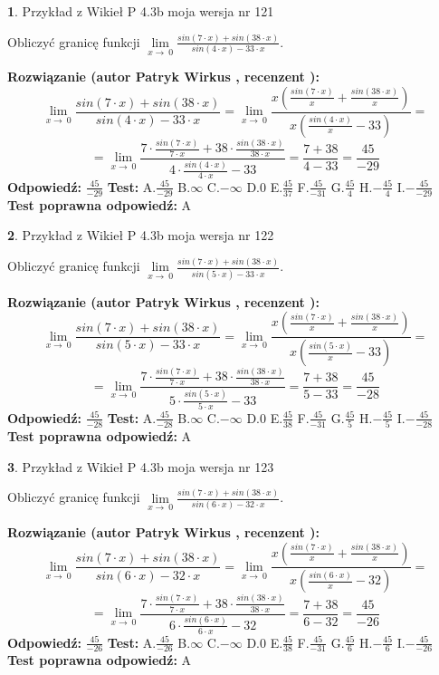 \documentclass[12pt, a4paper]{article}
\theoremstyle{definition} %
\newtheorem{zad}{}
\newcommand{\zadStart}[1]{\begin{zad}#1\newline}
\newcommand{\zadStop}{\end{zad}}
\newcommand{\rozwStart}[2]{\noindent \textbf{Rozwiązanie (autor #1 , recenzent #2): }\newline}
\newcommand{\rozwStop}{\newline}
\newcommand{\odpStart}{\noindent \textbf{Odpowiedź:}\newline}
\newcommand{\odpStop}{\newline}
\newcommand{\testStart}{\noindent \textbf{Test:}\newline}
\newcommand{\testStop}{\newline}
\newcommand{\kluczStart}{\noindent \textbf{Test poprawna odpowiedź:}\newline}
\newcommand{\kluczStop}{\newline}
\begin{document}
\zadStart{Przykład z Wikieł P 4.3b moja wersja nr 121}


Obliczyć granicę funkcji $\lim\limits_{x\to\ 0}\frac{sin(7 \cdot x)+sin(38 \cdot x)}{sin(4 \cdot x)-33 \cdot x}$.
\zadStop
\rozwStart{Patryk Wirkus}{}
$$\lim\limits_{x\to\ 0}\frac{sin(7 \cdot x)+sin(38 \cdot x)}{sin(4 \cdot x)-33 \cdot x}=\lim\limits_{x\to\ 0}\frac{x(\frac{sin(7 \cdot x)}{x}+\frac{sin(38 \cdot x)}{x})}{x(\frac{sin(4 \cdot x)}{x}-33)}=$$
$$=\lim\limits_{x\to\ 0}\frac{7 \cdot \frac{sin(7 \cdot x)}{7 \cdot x}+38 \cdot \frac{sin(38 \cdot x)}{38 \cdot x}}{4 \cdot \frac{sin(4 \cdot x)}{4 \cdot x}-33}=\frac{7+38}{4-33} = \frac{45}{-29}$$
\rozwStop
\odpStart
$\frac{45}{-29}$
\odpStop
\testStart
A.$\frac{45}{-29}$
B.$\infty$
C.$-\infty$
D.$0$
E.$\frac{45}{37}$
F.$\frac{45}{-31}$
G.$\frac{45}{4}$
H.$-\frac{45}{4}$
I.$-\frac{45}{-29}$
\testStop
\kluczStart
A
\kluczStop



\zadStart{Przykład z Wikieł P 4.3b moja wersja nr 122}


Obliczyć granicę funkcji $\lim\limits_{x\to\ 0}\frac{sin(7 \cdot x)+sin(38 \cdot x)}{sin(5 \cdot x)-33 \cdot x}$.
\zadStop
\rozwStart{Patryk Wirkus}{}
$$\lim\limits_{x\to\ 0}\frac{sin(7 \cdot x)+sin(38 \cdot x)}{sin(5 \cdot x)-33 \cdot x}=\lim\limits_{x\to\ 0}\frac{x(\frac{sin(7 \cdot x)}{x}+\frac{sin(38 \cdot x)}{x})}{x(\frac{sin(5 \cdot x)}{x}-33)}=$$
$$=\lim\limits_{x\to\ 0}\frac{7 \cdot \frac{sin(7 \cdot x)}{7 \cdot x}+38 \cdot \frac{sin(38 \cdot x)}{38 \cdot x}}{5 \cdot \frac{sin(5 \cdot x)}{5 \cdot x}-33}=\frac{7+38}{5-33} = \frac{45}{-28}$$
\rozwStop
\odpStart
$\frac{45}{-28}$
\odpStop
\testStart
A.$\frac{45}{-28}$
B.$\infty$
C.$-\infty$
D.$0$
E.$\frac{45}{38}$
F.$\frac{45}{-31}$
G.$\frac{45}{5}$
H.$-\frac{45}{5}$
I.$-\frac{45}{-28}$
\testStop
\kluczStart
A
\kluczStop



\zadStart{Przykład z Wikieł P 4.3b moja wersja nr 123}


Obliczyć granicę funkcji $\lim\limits_{x\to\ 0}\frac{sin(7 \cdot x)+sin(38 \cdot x)}{sin(6 \cdot x)-32 \cdot x}$.
\zadStop
\rozwStart{Patryk Wirkus}{}
$$\lim\limits_{x\to\ 0}\frac{sin(7 \cdot x)+sin(38 \cdot x)}{sin(6 \cdot x)-32 \cdot x}=\lim\limits_{x\to\ 0}\frac{x(\frac{sin(7 \cdot x)}{x}+\frac{sin(38 \cdot x)}{x})}{x(\frac{sin(6 \cdot x)}{x}-32)}=$$
$$=\lim\limits_{x\to\ 0}\frac{7 \cdot \frac{sin(7 \cdot x)}{7 \cdot x}+38 \cdot \frac{sin(38 \cdot x)}{38 \cdot x}}{6 \cdot \frac{sin(6 \cdot x)}{6 \cdot x}-32}=\frac{7+38}{6-32} = \frac{45}{-26}$$
\rozwStop
\odpStart
$\frac{45}{-26}$
\odpStop
\testStart
A.$\frac{45}{-26}$
B.$\infty$
C.$-\infty$
D.$0$
E.$\frac{45}{38}$
F.$\frac{45}{-31}$
G.$\frac{45}{6}$
H.$-\frac{45}{6}$
I.$-\frac{45}{-26}$
\testStop
\kluczStart
A
\kluczStop
\end{document}
